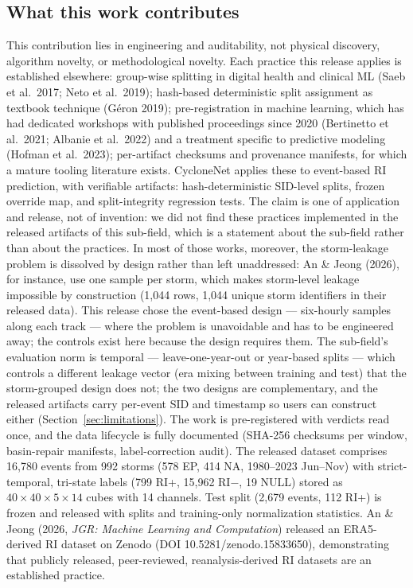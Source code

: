 \documentclass[11pt]{article}
\begin{document}
\subsection{What this work contributes}

This contribution lies in engineering and auditability, not physical
discovery, algorithm novelty, or methodological novelty. Each practice this
release applies is established elsewhere: group-wise splitting in digital
health and clinical ML (Saeb et al.\ 2017; Neto et al.\ 2019); hash-based
deterministic split assignment as textbook technique (G\'eron 2019);
pre-registration in machine learning, which has had dedicated workshops with
published proceedings since 2020 (Bertinetto et al.\ 2021; Albanie et al.\
2022) and a treatment specific to predictive modeling (Hofman et al.\ 2023);
per-artifact checksums and provenance manifests, for which a mature tooling
literature exists. CycloneNet applies these to event-based RI prediction, with
verifiable artifacts: hash-deterministic SID-level splits, frozen override map,
and split-integrity regression tests. The claim is one of application and
release, not of invention: we did not find these practices implemented in the
released artifacts of this sub-field, which is a statement about the sub-field
rather than about the practices. In most of those works, moreover, the
storm-leakage problem is dissolved by design rather than left unaddressed:
An \& Jeong (2026), for instance, use one sample per storm, which makes
storm-level leakage impossible by construction (1{,}044 rows, 1{,}044 unique
storm identifiers in their released data). This release chose the event-based
design --- six-hourly samples along each track --- where the problem is
unavoidable and has to be engineered away; the controls exist here because
the design requires them. The sub-field's evaluation norm is
temporal --- leave-one-year-out or year-based splits --- which controls a
different leakage vector (era mixing between training and test) that the
storm-grouped design does not; the two designs are complementary, and the
released artifacts carry per-event SID and timestamp so users can construct
either (Section~\ref{sec:limitations}). The work is pre-registered with
verdicts read once, and the data lifecycle is fully documented (SHA-256
checksums per window, basin-repair manifests, label-correction audit). The
released dataset comprises 16{,}780 events from 992 storms (578 EP, 414 NA,
1980--2023 Jun--Nov) with strict-temporal, tri-state labels (799 RI+,
15{,}962 RI$-$, 19 NULL) stored as $40\times40\times5\times14$ cubes with 14
channels. Test split (2{,}679 events, 112 RI+) is frozen and released with
splits and training-only normalization statistics. An \& Jeong (2026,
\emph{JGR: Machine Learning and Computation}) released an ERA5-derived RI
dataset on Zenodo (DOI 10.5281/zenodo.15833650), demonstrating that publicly
released, peer-reviewed, reanalysis-derived RI datasets are an established
practice.
\end{document}
